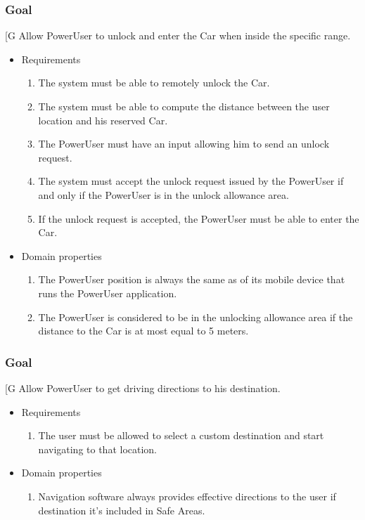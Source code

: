     \subsubsection{Goal }
    {[}G\arabic{goalctr}{]}
	Allow PowerUser to unlock and enter the Car when inside the specific range.
    \begin{itemize}
        \item Requirements
        \begin{enumerate}[REQ]
    	        \item The system must be able to remotely unlock the Car.
			    \item The system must be able to compute the distance between the user location and his reserved Car.
			    \item The PowerUser must have an input allowing him to send an unlock request.
			    \item The system must accept the unlock request issued by the PowerUser if and only if the PowerUser is in the unlock allowance area.
			    \item If the unlock request is accepted, the PowerUser must be able to enter the Car.
        \end{enumerate}
        \item Domain properties
        \begin{enumerate}[PRO]
                \item The PowerUser position is always the same as of its mobile device that runs the PowerUser application.
    			\item The PowerUser is considered to be in the unlocking allowance area if the distance to the Car is at most equal to 5 meters.
        \end{enumerate}
    \end{itemize}
    
    \subsubsection{Goal }
    {[}G\arabic{goalctr}{]}
    Allow PowerUser to get driving directions to his destination.
    \begin{itemize}
        \item Requirements
        \begin{enumerate}[REQ]
    			\item The user must be allowed to select a custom destination and start navigating to that location.
        \end{enumerate}
        \item Domain properties
        \begin{enumerate}[PRO]
    			\item Navigation software always provides effective directions to the user if destination it's included in Safe Areas.
        \end{enumerate}
    \end{itemize}
    
